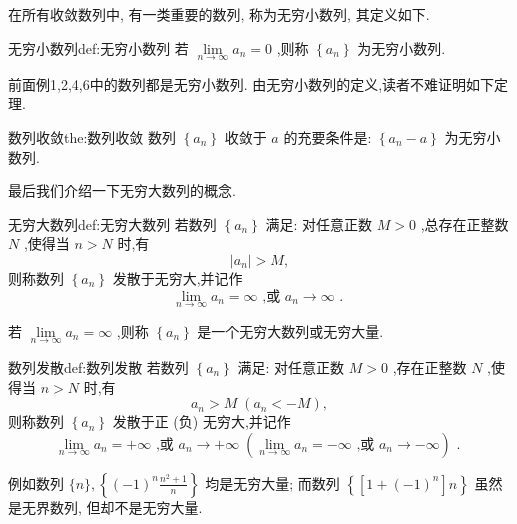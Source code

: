 在所有收敛数列中, 有一类重要的数列, 称为无穷小数列, 其定义如下.

\begin{definition}{无穷小数列}{def:无穷小数列}
若 \(\mathop{\lim }\limits_{{n \rightarrow  \infty }}{a}_{n} = 0\) ,则称 \(\left\{  {a}_{n}\right\}\) 为无穷小数列.
\end{definition}


前面例1,2,4,6中的数列都是无穷小数列. 由无穷小数列的定义,读者不难证明如下定理.

\begin{theorem}{数列收敛}{the:数列收敛}
数列 \(\left\{  {a}_{n}\right\}\) 收敛于 \(a\) 的充要条件是: \(\left\{  {{a}_{n} - a}\right\}\) 为无穷小数列.
\end{theorem}


最后我们介绍一下无穷大数列的概念.

\begin{definition}{无穷大数列}{def:无穷大数列}
若数列 \(\left\{  {a}_{n}\right\}\) 满足: 对任意正数 \(M > 0\) ,总存在正整数 \(N\) ,使得当 \(n > N\) 时,有
\[
\left| {a}_{n}\right|  > M,
\]
则称数列 \(\left\{  {a}_{n}\right\}\) 发散于无穷大,并记作
\[
\mathop{\lim }\limits_{{n \rightarrow  \infty }}{a}_{n} = \infty \text{ ,或 }{a}_{n} \rightarrow  \infty \text{ . }
\]
\end{definition}


\begin{remark}
\end{remark}
若 \(\mathop{\lim }\limits_{{n \rightarrow  \infty }}{a}_{n} = \infty\) ,则称 \(\left\{  {a}_{n}\right\}\) 是一个无穷大数列或无穷大量.

\begin{definition}{数列发散}{def:数列发散}
若数列 \(\left\{  {a}_{n}\right\}\) 满足: 对任意正数 \(M > 0\) ,存在正整数 \(N\) ,使得当 \(n > N\) 时,有
\[
{a}_{n} > M\;\left( {{a}_{n} <  - M}\right) ,
\]
则称数列 \(\left\{  {a}_{n}\right\}\) 发散于正 (负) 无穷大,并记作
\[
\mathop{\lim }\limits_{{n \rightarrow  \infty }}{a}_{n} =  + \infty \text{ ,或 }{a}_{n} \rightarrow   + \infty \;\left( {\mathop{\lim }\limits_{{n \rightarrow  \infty }}{a}_{n} =  - \infty \text{ ,或 }{a}_{n} \rightarrow   - \infty }\right) \text{ . }
\]
\end{definition}


例如数列 \(\{ n\} ,\left\{  {{\left( -1\right) }^{n}\frac{{n}^{2} + 1}{n}}\right\}\) 均是无穷大量; 而数列 \(\left\{  {\left\lbrack  {1 + {\left( -1\right) }^{n}}\right\rbrack  n}\right\}\) 虽然是无界数列, 但却不是无穷大量.

